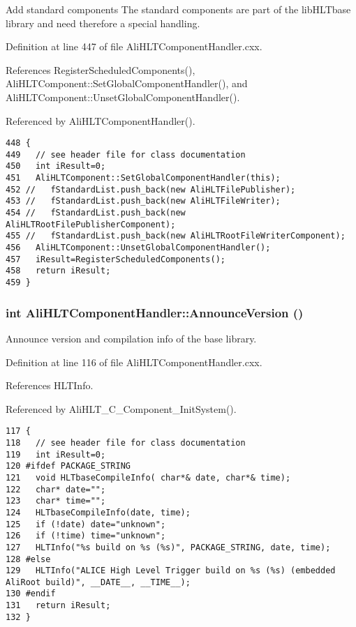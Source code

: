 Add standard components The standard components are part of the lib\-HLTbase library and need therefore a special handling. 

Definition at line 447 of file Ali\-HLTComponent\-Handler.cxx.

References Register\-Scheduled\-Components(), Ali\-HLTComponent::Set\-Global\-Component\-Handler(), and Ali\-HLTComponent::Unset\-Global\-Component\-Handler().

Referenced by Ali\-HLTComponent\-Handler().

\footnotesize\begin{verbatim}448 {
449   // see header file for class documentation
450   int iResult=0;
451   AliHLTComponent::SetGlobalComponentHandler(this);
452 //   fStandardList.push_back(new AliHLTFilePublisher);
453 //   fStandardList.push_back(new AliHLTFileWriter);
454 //   fStandardList.push_back(new AliHLTRootFilePublisherComponent);
455 //   fStandardList.push_back(new AliHLTRootFileWriterComponent);
456   AliHLTComponent::UnsetGlobalComponentHandler();
457   iResult=RegisterScheduledComponents();
458   return iResult;
459 }
\end{verbatim}\normalsize 


\subsubsection{\setlength{\rightskip}{0pt plus 5cm}int Ali\-HLTComponent\-Handler::Announce\-Version ()}\label{classAliHLTComponentHandler_a18}


Announce version and compilation info of the base library. 

Definition at line 116 of file Ali\-HLTComponent\-Handler.cxx.

References HLTInfo.

Referenced by Ali\-HLT\_\-C\_\-Component\_\-Init\-System().

\footnotesize\begin{verbatim}117 {
118   // see header file for class documentation
119   int iResult=0;
120 #ifdef PACKAGE_STRING
121   void HLTbaseCompileInfo( char*& date, char*& time);
122   char* date="";
123   char* time="";
124   HLTbaseCompileInfo(date, time);
125   if (!date) date="unknown";
126   if (!time) time="unknown";
127   HLTInfo("%s build on %s (%s)", PACKAGE_STRING, date, time);
128 #else
129   HLTInfo("ALICE High Level Trigger build on %s (%s) (embedded AliRoot build)", __DATE__, __TIME__);
130 #endif
131   return iResult;
132 }
\end{verbatim}\normalsize 


